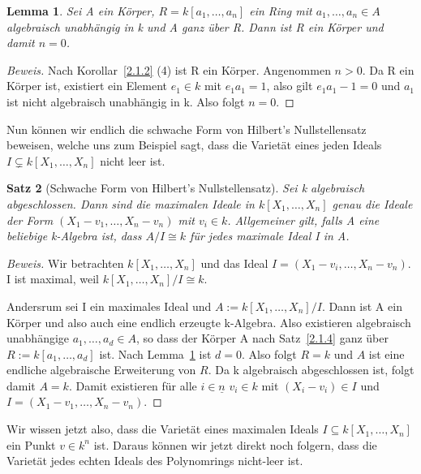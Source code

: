 \documentclass{article}
\newtheorem{satz}{Satz}
\newtheorem{lemma}[satz]{Lemma}
\begin{document}
	\begin{lemma}\label{hilfslemma}
	Sei A ein Körper, \(R = k[a_1, \ldots, a_n]\) ein Ring mit \(a_1, \ldots,
	a_n \in A\) algebraisch unabhängig in k und A ganz über R.
	Dann ist R ein Körper und damit \(n = 0\).
	\end{lemma}

	\begin{proof}[Beweis]
	Nach Korollar~\ref{2.1.2} (4) ist R ein Körper. Angenommen \(n > 0\).
	Da R ein Körper ist, existiert ein Element \(e_1 \in k\) mit \(e_1a_1 = 1\),
	also gilt \(e_1a_1 - 1 = 0\) und \(a_1\) ist nicht algebraisch unabhängig in k.
	Also folgt \(n = 0\).
	\end{proof}
	
	Nun können wir endlich die schwache Form von Hilbert's Nullstellensatz beweisen, welche uns
	zum Beispiel sagt, dass die Varietät eines jeden Ideals \(I \subsetneq k[X_1,\ldots,X_n]\) nicht leer ist.

	\begin{satz}[Schwache Form von Hilbert's Nullstellensatz]\label{schwach}
	Sei k algebraisch abgeschlossen. Dann sind die maximalen Ideale in
	\(k[X_1, \ldots, X_n]\) genau die Ideale der Form \((X_1-v_1,\ldots,
	X_n-v_n)\) mit \(v_i \in k\). Allgemeiner gilt, falls A eine beliebige
	k-Algebra ist, dass \(A/I \cong k\) für jedes maximale Ideal I in A.
	\end{satz}

	\begin{proof}[Beweis]
	Wir betrachten \(k[X_1, \ldots, X_n]\) und das Ideal \(I = (X_1 - v_i,
	\ldots, X_n - v_n)\). I ist maximal, weil \(k[X_1, \ldots, X_n]/I \cong k\).

	Andersrum sei I ein maximales Ideal und \(A := k[X_1, \ldots, X_n]/I\).
	Dann ist A ein Körper und also auch eine endlich erzeugte k-Algebra. Also
	existieren algebraisch unabhängige \(a_1, \ldots, a_d \in A\), so dass
	der Körper A nach Satz~\ref{2.1.4} ganz über \(R := k[a_1,\ldots, a_d]\) ist.
	Nach Lemma~\ref{hilfslemma} ist \(d = 0\).
	Also folgt \(R = k\) und \(A\) ist eine endliche algebraische Erweiterung von
	\(R\). Da k algebraisch abgeschlossen ist, folgt damit \(A = k\).
	Damit existieren für alle \(i \in \underline{n}\) \(v_i \in k\) mit
	\((X_i - v_i) \in I\) und \(I = (X_1 - v_1, \ldots, X_n - v_n)\).
	\end{proof}
	
	Wir wissen jetzt also, dass die Varietät eines maximalen Ideals \(I \subseteq 		k[X_1,\ldots,X_n]\) ein Punkt \(v \in k^n\) ist. Daraus können wir jetzt direkt noch folgern, dass die Varietät jedes echten Ideals des Polynomrings nicht-leer ist.
\end{document}
